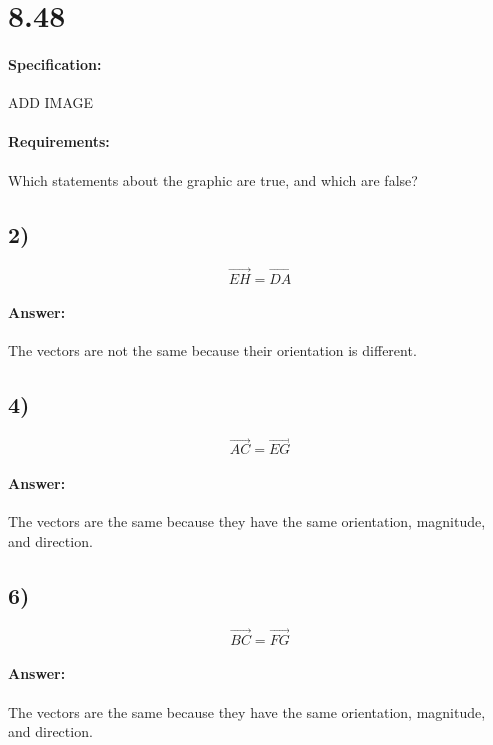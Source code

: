 \documentclass{article}
\begin{document}
\section{8.48}
\paragraph{Specification:}
ADD IMAGE

\paragraph{Requirements:}
Which statements about the graphic are true, and which are false?

\subsection{2)}

\begin{equation}
    \vec{EH} = \vec{DA}
\end{equation}

\paragraph{Answer:}
The vectors are not the same because their orientation is different.

\subsection{4)}

\begin{equation}
    \vec{AC} = \vec{EG}
\end{equation}

\paragraph{Answer:}
The vectors are the same because they have the same orientation, magnitude, and direction.

\subsection{6)}

\begin{equation}
    \vec{BC} = \vec{FG}
\end{equation}

\paragraph{Answer:}
The vectors are the same because they have the same orientation, magnitude, and direction.
\end{document}
